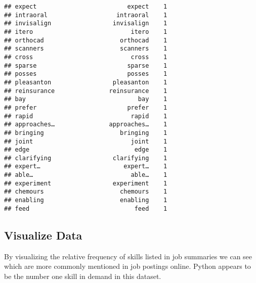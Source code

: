 \documentclass[]{article}
\newenvironment{Shaded}{\begin{snugshade}}{\end{snugshade}}
\newcommand{\DataTypeTok}[1]{\textcolor[rgb]{0.13,0.29,0.53}{#1}}
\newcommand{\DecValTok}[1]{\textcolor[rgb]{0.00,0.00,0.81}{#1}}
\newcommand{\FloatTok}[1]{\textcolor[rgb]{0.00,0.00,0.81}{#1}}
\newcommand{\KeywordTok}[1]{\textcolor[rgb]{0.13,0.29,0.53}{\textbf{#1}}}
\newcommand{\NormalTok}[1]{#1}
\newcommand{\OperatorTok}[1]{\textcolor[rgb]{0.81,0.36,0.00}{\textbf{#1}}}
\newcommand{\OtherTok}[1]{\textcolor[rgb]{0.56,0.35,0.01}{#1}}
\newcommand{\StringTok}[1]{\textcolor[rgb]{0.31,0.60,0.02}{#1}}
\begin{document}
\begin{verbatim}
## expect                         expect    1
## intraoral                   intraoral    1
## invisalign                 invisalign    1
## itero                           itero    1
## orthocad                     orthocad    1
## scanners                     scanners    1
## cross                           cross    1
## sparse                         sparse    1
## posses                         posses    1
## pleasanton                 pleasanton    1
## reinsurance               reinsurance    1
## bay                               bay    1
## prefer                         prefer    1
## rapid                           rapid    1
## approaches…               approaches…    1
## bringing                     bringing    1
## joint                           joint    1
## edge                             edge    1
## clarifying                 clarifying    1
## expert…                       expert…    1
## able…                           able…    1
## experiment                 experiment    1
## chemours                     chemours    1
## enabling                     enabling    1
## feed                             feed    1
\end{verbatim}

\hypertarget{visualize-data}{%
\subsection{Visualize Data}\label{visualize-data}}

By visualizing the relative frequency of skills listed in job summaries
we can see which are more commonly mentioned in job postings online.
Python appears to be the number one skill in demand in this dataset.

\begin{Shaded}
\end{Shaded}
\end{document}
